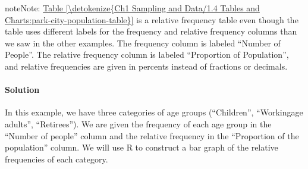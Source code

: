 \documentclass[letterpaper,10pt,english]{jupyterBook}
\begin{document}
\begin{sphinxadmonition}{note}{Note:}
\sphinxAtStartPar
\hyperref[\detokenize{Ch1 Sampling and Data/1.4 Tables and Charts:park-city-population-table}]{Table \ref{\detokenize{Ch1 Sampling and Data/1.4 Tables and Charts:park-city-population-table}}} is a relative frequency table even though the table uses different labels for the frequency and relative frequency columns than we saw in the other examples. The frequency column is labeled “Number of People”. The relative frequency column is labeled “Proportion of Population”, and relative frequencies are given in percents instead of fractions or decimals.
\end{sphinxadmonition}


\paragraph{Solution}
\label{\detokenize{Ch1 Sampling and Data/1.4 Tables and Charts:id2}}
\sphinxAtStartPar
In this example, we have three categories of age groups (“Children”, “Working\sphinxhyphen{}age adults”, “Retirees”). We are given the frequency of each age group in the “Number of people” column and the relative frequency in the “Proportion of the population” column. We will use R to construct a bar graph of the relative frequencies of each category.
\end{document}

